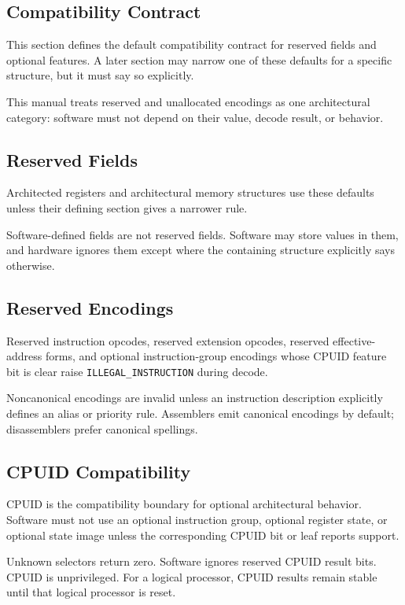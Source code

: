 \clearpage
\subsection{Compatibility Contract}

This section defines the default compatibility contract for reserved fields and optional features. A later section
may narrow one of these defaults for a specific structure, but it must say so explicitly.

This manual treats reserved and unallocated encodings as one architectural category: software must not depend on their
value, decode result, or behavior.

\subsection{Reserved Fields}
Architected registers and architectural memory structures use these defaults unless their defining section gives a
narrower rule.

Software-defined fields are not reserved fields. Software may store values in them, and hardware ignores them except
where the containing structure explicitly says otherwise.



\subsection{Reserved Encodings}
Reserved instruction opcodes, reserved extension opcodes, reserved effective-address forms, and optional
instruction-group encodings whose CPUID feature bit is clear raise \texttt{ILLEGAL\_INSTRUCTION} during decode.

Noncanonical encodings are invalid unless an instruction description explicitly defines an alias or priority rule.
Assemblers emit canonical encodings by default; disassemblers prefer canonical spellings.

\Needspace{3.6in}
\subsection{CPUID Compatibility}
CPUID is the compatibility boundary for optional architectural behavior. Software must not use an optional
instruction group, optional register state, or optional state image unless the corresponding CPUID bit or leaf
reports support.

Unknown selectors return zero. Software ignores reserved CPUID result bits. CPUID is unprivileged. For a logical
processor, CPUID results remain stable until that logical processor is reset.

